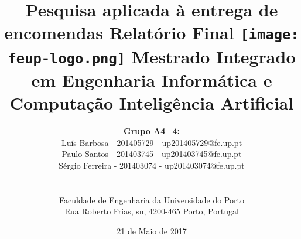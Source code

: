\documentclass[a4paper]{article}
\begin{document}
\setlength{\textwidth}{16cm}
\setlength{\textheight}{22cm}

\title{\Huge\textbf{Pesquisa aplicada à entrega de encomendas}\linebreak\linebreak\linebreak
\Large\textbf{Relatório Final}\linebreak\linebreak
\linebreak\linebreak
\texttt{[image: feup-logo.png]}\linebreak\linebreak
\linebreak\linebreak
\Large{Mestrado Integrado em Engenharia Informática e Computação} \linebreak\linebreak
\Large{Inteligência Artificial}\linebreak
}

\author{\textbf{Grupo A4\_4:}\\ Luís  Barbosa - 201405729 - up201405729@fe.up.pt\\ Paulo Santos - 201403745 - up201403745@fe.up.pt \\ Sérgio Ferreira - 201403074 - up201403074@fe.up.pt \\\linebreak\linebreak \\
 \\ Faculdade de Engenharia da Universidade do Porto \\ Rua Roberto Frias, s\/n, 4200-465 Porto, Portugal \linebreak\linebreak\linebreak
\linebreak\linebreak\vspace{1cm}}
\date{21 de Maio de 2017}
\maketitle
\thispagestyle{empty}


\newpage
\end{document}
